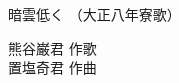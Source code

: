 \documentclass[10pt,b5j]{tarticle} %
\begin{document}
\begin{minipage}[c]{0.7\hsize} %
    \begin{center}
        {\LARGE
            暗雲低く %
        }
        {\small 
            （大正八年寮歌） %
        }
    \end{center}
\end{minipage}
\begin{minipage}[c]{0.3\hsize} %
    \begin{flushright} %
        熊谷巌君 作歌\\置塩奇君 作曲 %
    \end{flushright}
\end{minipage}
\end{document}
